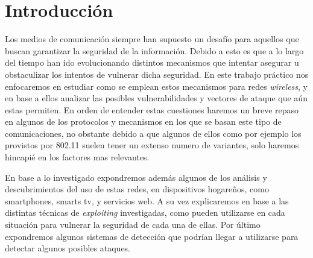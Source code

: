 \documentclass[10pt,a4paper]{article}
\begin{document}
{} %

\grupo{}


\maketitle

\tableofcontents

\pagebreak

\section{Introducción}

Los medios de comunicación siempre han supuesto un desafío para aquellos que buscan garantizar la seguridad de la información. Debido a esto es que a lo largo del tiempo han ido evolucionando distintos mecanismos que intentar asegurar u obstaculizar los intentos de vulnerar dicha seguridad. En este trabajo práctico nos enfocaremos en estudiar como se emplean estos mecanismos para redes \textit{wireless}, y en base a ellos analizar las posibles vulnerabilidades y vectores de ataque que aún estas permiten. En orden de entender estas cuestiones haremos un breve repaso en algunos de los protocolos y mecanismos en los que se basan este tipo de comunicaciones, no obstante debido a que algunos de ellos como por ejemplo los provistos por 802.11 suelen tener un extenso numero de variantes, solo haremos hincapié en los factores mas relevantes.

En base a lo investigado expondremos además algunos de los análisis y descubrimientos del uso de estas redes, en dispositivos hogareños, como smartphones, smarts tv, y servicios web. A su vez explicaremos en base a las distintas técnicas de \textit{exploiting} investigadas, como pueden utilizarse en cada situación para vulnerar la seguridad de cada una de ellas. Por último expondremos algunos sistemas de detección que podrían llegar a utilizarse para detectar algunos posibles ataques.
\end{document}
